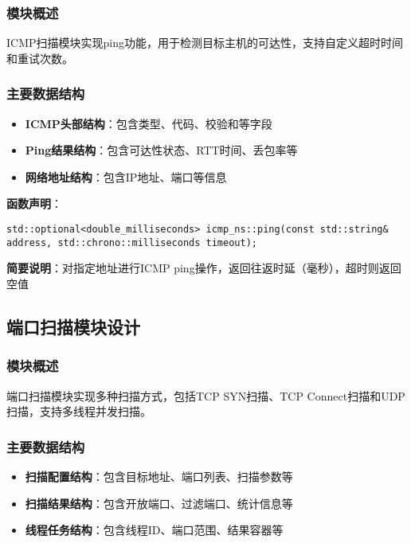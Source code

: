 \documentclass[12pt,hyperref,a4paper,UTF8]{ctexart}
\begin{document}
\subsubsection{模块概述}
ICMP扫描模块实现ping功能，用于检测目标主机的可达性，支持自定义超时时间和重试次数。

\subsubsection{主要数据结构}
\begin{itemize}
    \item \textbf{ICMP头部结构}：包含类型、代码、校验和等字段
    \item \textbf{Ping结果结构}：包含可达性状态、RTT时间、丢包率等
    \item \textbf{网络地址结构}：包含IP地址、端口等信息
\end{itemize}


\textbf{函数声明}：
\begin{verbatim}
std::optional<double_milliseconds> icmp_ns::ping(const std::string& address, std::chrono::milliseconds timeout);
\end{verbatim}
\textbf{简要说明}：对指定地址进行ICMP ping操作，返回往返时延（毫秒），超时则返回空值

\subsection{端口扫描模块设计}

\subsubsection{模块概述}
端口扫描模块实现多种扫描方式，包括TCP SYN扫描、TCP Connect扫描和UDP扫描，支持多线程并发扫描。

\subsubsection{主要数据结构}
\begin{itemize}
    \item \textbf{扫描配置结构}：包含目标地址、端口列表、扫描参数等
    \item \textbf{扫描结果结构}：包含开放端口、过滤端口、统计信息等
    \item \textbf{线程任务结构}：包含线程ID、端口范围、结果容器等
\end{itemize}
\end{document}
